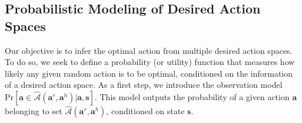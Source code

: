 \subsection{Probabilistic Modeling of Desired Action Spaces}
\label{section:sub:prob_desired_action_space}


Our objective is to infer the optimal action from multiple desired action spaces.
To do so, we seek to define a probability (or utility) function that measures how likely any given random action is to be optimal, conditioned on the information of a desired action space.
As a first step, we introduce the observation model $\text{Pr} [\bm a \in \hat{\mathcal{A} }{(\bm a^r, \bm a^h)} | \bm a , \bm s] $. 
This model outputs the probability of a given action $\bm a$ belonging to set $\hat {\mathcal{A}} {(\bm a^r, \bm a^h)}$, conditioned on state $\bm s$.



